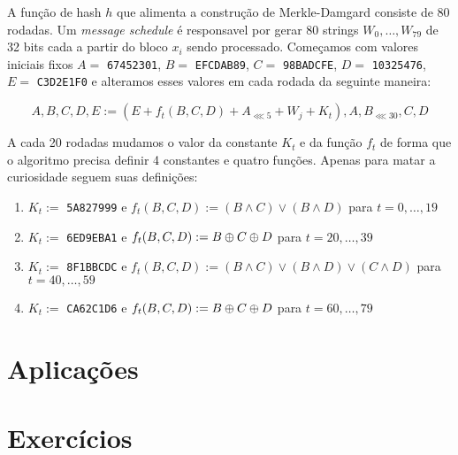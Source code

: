 A função de hash $h$ que alimenta a construção de Merkle-Damgard consiste de 80 rodadas.
Um {\em message schedule} é responsavel por gerar 80 strings $W_0, \dots, W_{79}$ de 32 bits cada a partir do bloco $x_i$ sendo processado. 
Começamos com valores iniciais fixos $A =$ {\tt 67452301}, $B =$ {\tt EFCDAB89}, $C =$ {\tt 98BADCFE}, $D =$ {\tt 10325476}, $E =$ {\tt C3D2E1F0} e alteramos esses valores em cada rodada da seguinte maneira:

\begin{displaymath}
  A, B, C, D, E := (E + f_t(B,C,D) + A_{\lll 5} + W_j + K_t), A, B_{\lll 30}, C, D
\end{displaymath}

A cada 20 rodadas mudamos o valor da constante $K_t$ e da função $f_t$ de forma que o algoritmo precisa definir 4 constantes e quatro funções.
Apenas para matar a curiosidade seguem suas definições:
\begin{enumerate}
\item $K_t :=$ {\tt 5A827999} e $f_t(B,C,D) := (B \land C) \lor (B \land D)$ para $t = 0, \dots, 19$
\item $K_t :=$ {\tt 6ED9EBA1} e $f_t(B,C,D) := B \oplus C \oplus D$ para $t = 20, \dots, 39$ 
\item $K_t :=$ {\tt 8F1BBCDC} e $f_t(B,C,D) := (B \land C) \lor (B \land D) \lor (C \land D)$ para $t = 40, \dots, 59$
\item $K_t :=$ {\tt CA62C1D6} e $f_t(B,C,D) := B \oplus C \oplus D$ para $t = 60, \dots, 79$ 
\end{enumerate}


\section{Aplicações}
\label{sec:aplicacoes}

\section{Exercícios}
\label{sec:exercicios}


